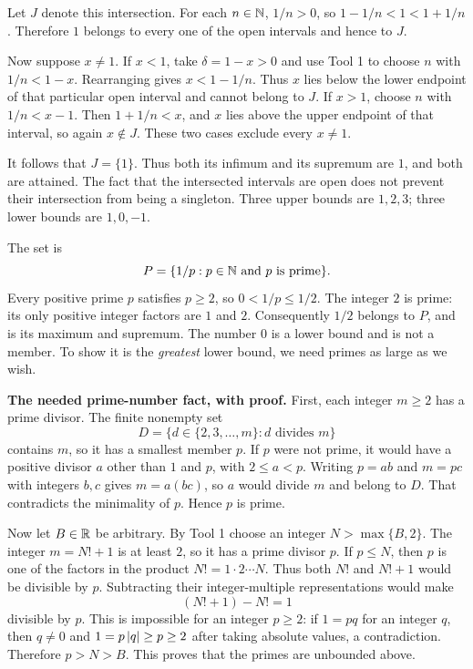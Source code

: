 \label{bounds:r}
Let $J$ denote this intersection. For each $n\in\mathbb{N}$, $1/n>0$,
so $1-1/n<1<1+1/n$. Therefore $1$ belongs to every one of
the open intervals and hence to $J$.

Now suppose $x\ne1$. If $x<1$, take $\delta=1-x>0$ and use
Tool 1 to choose $n$ with $1/n<1-x$. Rearranging gives
$x<1-1/n$. Thus $x$ lies below the lower endpoint of that
particular open interval and cannot belong to $J$.
If $x>1$, choose $n$ with $1/n<x-1$. Then $1+1/n<x$, and
$x$ lies above the upper endpoint of that interval, so again
$x\notin J$. These two cases exclude every $x\ne1$.

It follows that $J=\{1\}$. Thus both its infimum and its supremum
are $1$, and both are attained. The fact that the intersected
intervals are open does not prevent their intersection from being a
singleton. Three upper bounds are $1,2,3$; three lower bounds are
$1,0,-1$.

\label{bounds:s}
The set is
\[
 P=\{1/p:p\in\mathbb{N}\text{ and }p\text{ is prime}\}.
\]
Every positive prime $p$ satisfies $p\geq2$, so
$0<1/p\leq1/2$. The integer $2$ is prime: its only positive
integer factors are $1$ and $2$. Consequently $1/2$ belongs to
$P$, and is its maximum and supremum. The number $0$ is a lower
bound and is not a member. To show it is the \emph{greatest}
lower bound, we need primes as large as we wish.

\textbf{The needed prime-number fact, with proof.}
First, each integer $m\geq2$ has a prime divisor. The finite
nonempty set
\[
 D=\{d\in\{2,3,\ldots,m\}:d\text{ divides }m\}
\]
contains $m$, so it has a smallest member $p$. If $p$ were not
prime, it would have a positive divisor $a$ other than $1$ and
$p$, with $2\leq a<p$. Writing $p=ab$ and $m=pc$ with integers
$b,c$ gives $m=a(bc)$, so $a$ would divide $m$ and belong to
$D$. That contradicts the minimality of $p$. Hence $p$ is prime.

Now let $B\in\mathbb{R}$ be arbitrary. By Tool 1 choose an integer
$N>\max\{B,2\}$. The integer $m=N!+1$ is at least $2$, so it
has a prime divisor $p$. If $p\leq N$, then $p$ is one of the
factors in the product $N!=1\cdot2\cdots N$. Thus both $N!$ and
$N!+1$ would be divisible by $p$. Subtracting their integer-multiple
representations would make
\[
 (N!+1)-N!=1
\]
divisible by $p$. This is impossible for an integer $p\geq2$:
if $1=pq$ for an integer $q$, then $q\ne0$ and
$1=p\left|q\right|\geq p\geq2$ after taking absolute values, a
contradiction. Therefore $p>N>B$. This proves that the primes
are unbounded above.

